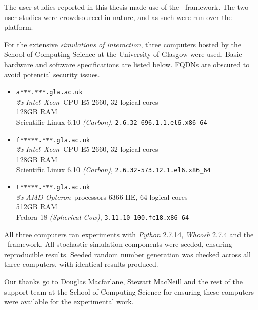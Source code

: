 
\begin{preamble}
{}

The user studies reported in this thesis made use of the \treconomics~framework. The two user studies were crowdsourced in nature, and as such were run over the~ platform.

For the extensive \emph{simulations of interaction}, three computers hosted by the School of Computing Science at the University of Glasgow were used. Basic hardware and software specifications are listed below. FQDNs are obscured to avoid potential security issues.

\begin{itemize}
    
    \item{\texttt{a***.***.gla.ac.uk}\\\emph{2x} \emph{Intel}\textregistered~\emph{Xeon}\textregistered~CPU E5-2660, 32 logical cores\\128GB RAM\\Scientific Linux 6.10 \emph{(Carbon)}, \texttt{2.6.32-696.1.1.el6.x86\_64}}
    
    \item{\texttt{f*****.***.gla.ac.uk}\\\emph{2x} \emph{Intel}\textregistered~\emph{Xeon}\textregistered~CPU E5-2660, 32 logical cores\\128GB RAM\\Scientific Linux 6.10 \emph{(Carbon)}, \texttt{2.6.32-573.12.1.el6.x86\_64}}
    
    \item{\texttt{t*****.***.gla.ac.uk}\\\emph{8x} \emph{AMD Opteron}\texttrademark~processors 6366 HE, 64 logical cores\\512GB RAM\\Fedora 18 \emph{(Spherical Cow)}, \texttt{3.11.10-100.fc18.x86\_64}}
    
\end{itemize}

All three computers ran experiments with \emph{Python} 2.7.14, \emph{Whoosh} 2.7.4 and the \simiir~framework. All stochastic simulation components were seeded, ensuring reproducible results. Seeded random number generation was checked across all three computers, with identical results produced.

Our thanks go to Douglas Macfarlane, Stewart MacNeill and the rest of the support team at the School of Computing Science for ensuring these computers were available for the experimental work.
\end{preamble}

\newpage
\thispagestyle{empty}
\mbox{}
\newpage
\thispagestyle{empty}
\mbox{}
\newpage
\mbox{}